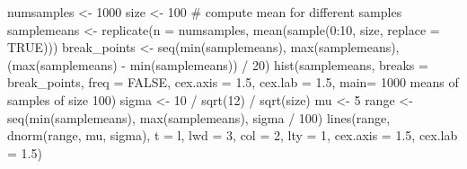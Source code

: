 \documentclass[
  letterpaper,
  DIV=11,
  numbers=noendperiod]{scrreprt}
\newenvironment{Shaded}{\begin{snugshade}}{\end{snugshade}}
\newcommand{\AttributeTok}[1]{\textcolor[rgb]{0.40,0.45,0.13}{#1}}
\newcommand{\CommentTok}[1]{\textcolor[rgb]{0.37,0.37,0.37}{#1}}
\newcommand{\ConstantTok}[1]{\textcolor[rgb]{0.56,0.35,0.01}{#1}}
\newcommand{\DecValTok}[1]{\textcolor[rgb]{0.68,0.00,0.00}{#1}}
\newcommand{\FloatTok}[1]{\textcolor[rgb]{0.68,0.00,0.00}{#1}}
\newcommand{\FunctionTok}[1]{\textcolor[rgb]{0.28,0.35,0.67}{#1}}
\newcommand{\NormalTok}[1]{\textcolor[rgb]{0.00,0.23,0.31}{#1}}
\newcommand{\OtherTok}[1]{\textcolor[rgb]{0.00,0.23,0.31}{#1}}
\newcommand{\SpecialCharTok}[1]{\textcolor[rgb]{0.37,0.37,0.37}{#1}}
\newcommand{\StringTok}[1]{\textcolor[rgb]{0.13,0.47,0.30}{#1}}
\begin{document}
\begin{Shaded}
\begin{Highlighting}[]
\NormalTok{numsamples }\OtherTok{\textless{}{-}} \DecValTok{1000}
\NormalTok{size }\OtherTok{\textless{}{-}} \DecValTok{100}
\CommentTok{\# compute mean for different samples}
\NormalTok{samplemeans }\OtherTok{\textless{}{-}} \FunctionTok{replicate}\NormalTok{(}\AttributeTok{n =}\NormalTok{ numsamples, }\FunctionTok{mean}\NormalTok{(}\FunctionTok{sample}\NormalTok{(}\DecValTok{0}\SpecialCharTok{:}\DecValTok{10}\NormalTok{, size, }\AttributeTok{replace =} \ConstantTok{TRUE}\NormalTok{)))}
\NormalTok{break\_points }\OtherTok{\textless{}{-}} \FunctionTok{seq}\NormalTok{(}\FunctionTok{min}\NormalTok{(samplemeans), }\FunctionTok{max}\NormalTok{(samplemeans), }
\NormalTok{                    (}\FunctionTok{max}\NormalTok{(samplemeans) }\SpecialCharTok{{-}} \FunctionTok{min}\NormalTok{(samplemeans)) }\SpecialCharTok{/} \DecValTok{20}\NormalTok{)}
\FunctionTok{hist}\NormalTok{(samplemeans, }\AttributeTok{breaks =}\NormalTok{ break\_points, }\AttributeTok{freq =} \ConstantTok{FALSE}\NormalTok{, }
     \AttributeTok{cex.axis =} \FloatTok{1.5}\NormalTok{, }\AttributeTok{cex.lab =} \FloatTok{1.5}\NormalTok{,}
     \AttributeTok{main=} \StringTok{\textquotesingle{}1000 means of samples of size 100\textquotesingle{}}\NormalTok{)}
\NormalTok{sigma }\OtherTok{\textless{}{-}} \DecValTok{10} \SpecialCharTok{/} \FunctionTok{sqrt}\NormalTok{(}\DecValTok{12}\NormalTok{) }\SpecialCharTok{/} \FunctionTok{sqrt}\NormalTok{(size)}
\NormalTok{mu }\OtherTok{\textless{}{-}} \DecValTok{5}
\NormalTok{range }\OtherTok{\textless{}{-}} \FunctionTok{seq}\NormalTok{(}\FunctionTok{min}\NormalTok{(samplemeans), }\FunctionTok{max}\NormalTok{(samplemeans), sigma }\SpecialCharTok{/} \DecValTok{100}\NormalTok{)}
\FunctionTok{lines}\NormalTok{(range, }
      \FunctionTok{dnorm}\NormalTok{(range, mu, sigma),}
      \AttributeTok{t =} \StringTok{\textquotesingle{}l\textquotesingle{}}\NormalTok{, }\AttributeTok{lwd =} \DecValTok{3}\NormalTok{, }\AttributeTok{col =} \DecValTok{2}\NormalTok{, }\AttributeTok{lty =} \DecValTok{1}\NormalTok{, }\AttributeTok{cex.axis =} \FloatTok{1.5}\NormalTok{, }\AttributeTok{cex.lab =} \FloatTok{1.5}\NormalTok{)}
\end{Highlighting}
\end{Shaded}
\end{document}
